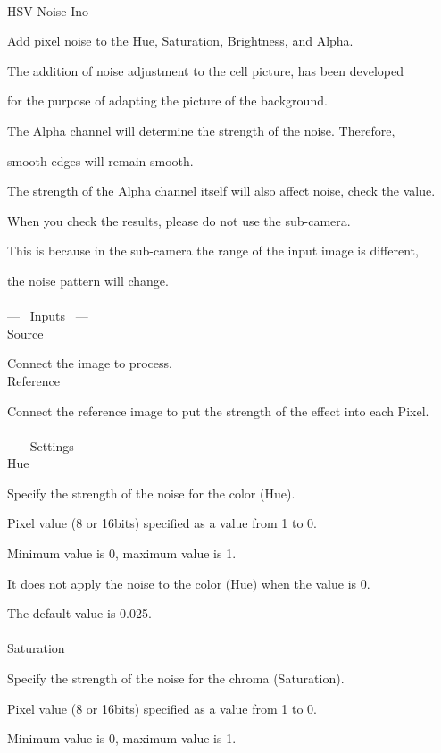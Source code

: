 \documentclass[a4paper,12pt]{article}
\begin{document}
\thispagestyle{empty}

\Large
\noindent \\
HSV Noise Ino\medskip
\par
\normalsize
Add pixel noise to the Hue, Saturation, Brightness, and Alpha.\par
The addition of noise adjustment to the cell picture, has been developed\par
for the purpose of adapting the picture of the background.\\
\par
The Alpha channel will determine the strength of the noise. Therefore,\par
smooth edges will remain smooth.\par
The strength of the Alpha channel itself will also affect noise, check the value.\\
\par
When you check the results, please do not use the sub-camera.\par
This is because in the sub-camera the range of the input image is different,\par
the noise pattern will change.\\
\\
--- \ Inputs \ ---\\
Source\par
Connect the image to process.\\
Reference\par
Connect the reference image to put the strength of the effect into each Pixel.\\
\\
--- \ Settings \ ---\\
Hue\par
Specify the strength of the noise for the color (Hue).\par
Pixel value (8 or 16bits) specified as a value from 1 to 0.\par
Minimum value is 0, maximum value is 1.\par
It does not apply the noise to the color (Hue) when the value is 0.\par
The default value is 0.025.\\
\\
Saturation\par
Specify the strength of the noise for the chroma (Saturation).\par
Pixel value (8 or 16bits) specified as a value from 1 to 0.\par
Minimum value is 0, maximum value is 1.\par
\end{document}
